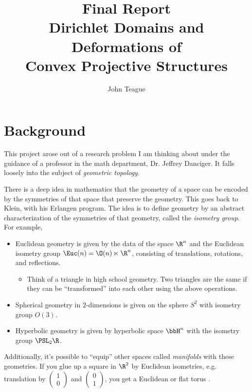\documentclass[12pt]{article}%
\begin{document}
\title{Final Report\\ \vspace{0.1in}
\Large Dirichlet Domains and Deformations of\\
Convex Projective Structures}
\author{John Teague}
\maketitle

\section{Background}

This project arose out of a research problem I am thinking about under the guidance of a professor in the math department, Dr. Jeffrey Danciger. It falls loosely into the subject of \textit{geometric topology}.


There is a deep idea in mathematics that the geometry of a space can be encoded by the symmetries of that space that preserve the geometry. This goes back to Klein, with his Erlangen program. The idea is to define geometry by an abstract characterization of the symmetries of that geometry, called the \textit{isometry group}. For example, 
\begin{itemize}
	\item Euclidean geometry is given by the data of the space $\R^n$ and the Euclidean isometry group $\Euc(n) = \O(n) \ltimes \R^n$, consisting of translations, rotations, and reflections.
	\begin{itemize}
		\item Think of a triangle in high school geometry. Two triangles are the same if they can be ``transformed'' into each other using the above operations.
	\end{itemize}
	\item Spherical geometry in $2$-dimensions is given on the sphere $S^2$ with isometry group $O(3)$.
	\item Hyperbolic geometry is given by hyperbolic space $\bbH^n$ with the isometry group $\PSL_2\R$.
\end{itemize}
Additionally, it's possible to ``equip'' other spaces called \textit{manifolds} with these geometries. If you glue up a square in $\R^2$ by Euclidean isometries, e.g. translation by $\begin{pmatrix} 1\\0 \end{pmatrix}$ and $\begin{pmatrix} 0\\1 \end{pmatrix}$, you get a Euclidean or flat torus \cite{ballas}.
\end{document}
